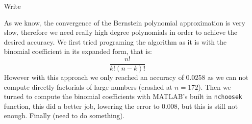 \begin{problem}
Write
\end{problem}

\begin{solution}
As we know, the convergence of the Bernstein polynomial approximation is very slow, therefore we need really high degree polynomials in order to achieve the desired accuracy. We first tried programing the algorithm as it is with the binomial coefficient in its expanded form, that is:
\begin{equation*}
\frac{n!}{k!(n-k)!}
\end{equation*}
However with this approach we only reached an accuracy of 0.0258 as we can not compute directly factorials of large numbers (crashed at $n = 172$). Then we turned to compute the binomial coefficients with MATLAB's built in \texttt{nchoosek} function, this did a better job, lowering the error to 0.008, but this is still not enough. Finally (need to do something).

\end{solution}